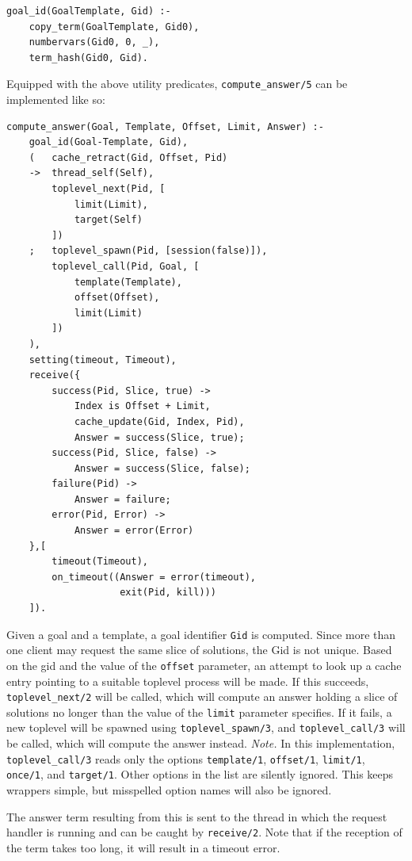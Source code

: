 \begin{verbatim}
goal_id(GoalTemplate, Gid) :-
    copy_term(GoalTemplate, Gid0),
    numbervars(Gid0, 0, _),
    term_hash(Gid0, Gid).
\end{verbatim}
 
\noindent Equipped with the above utility predicates, \texttt{compute\_answer/5} can be implemented like so:
 
\begin{verbatim}
compute_answer(Goal, Template, Offset, Limit, Answer) :-
    goal_id(Goal-Template, Gid),
    (   cache_retract(Gid, Offset, Pid)
    ->  thread_self(Self),
        toplevel_next(Pid, [
            limit(Limit),
            target(Self)
        ])
    ;   toplevel_spawn(Pid, [session(false)]),
        toplevel_call(Pid, Goal, [
            template(Template),
            offset(Offset),
            limit(Limit)
        ])
    ),
    setting(timeout, Timeout),
    receive({
        success(Pid, Slice, true) ->
            Index is Offset + Limit,
            cache_update(Gid, Index, Pid),
            Answer = success(Slice, true);
        success(Pid, Slice, false) ->
            Answer = success(Slice, false);
        failure(Pid) ->
            Answer = failure;
        error(Pid, Error) -> 
            Answer = error(Error) 
    },[
        timeout(Timeout),
        on_timeout((Answer = error(timeout), 
                    exit(Pid, kill)))
    ]).
\end{verbatim}

\noindent Given a goal and a template, a goal identifier \texttt{Gid} is computed. Since more than one client may request the same slice of solutions, the Gid is not unique. Based on the gid and the value of the \texttt{offset} parameter, an attempt to look up a cache entry pointing to a suitable toplevel process will be made. If this succeeds, \texttt{toplevel\_next/2} will be called, which will compute an answer holding a slice of solutions no longer than the value of the \texttt{limit} parameter specifies. If it fails, a new toplevel will be spawned using \texttt{toplevel\_spawn/3}, and \texttt{toplevel\_call/3} will be called, which will compute the answer instead. 
\noindent\textit{Note.} In this implementation, \texttt{toplevel\_call/3} reads only the options \texttt{template/1}, \texttt{offset/1}, \texttt{limit/1}, \texttt{once/1}, and \texttt{target/1}. Other options in the list are silently ignored. This keeps wrappers simple, but misspelled option names will also be ignored.

The answer term resulting from this is sent to the thread in which the request handler is running and can be caught by \texttt{receive/2}. Note that if the reception of the term takes too long, it will result in a timeout error.

